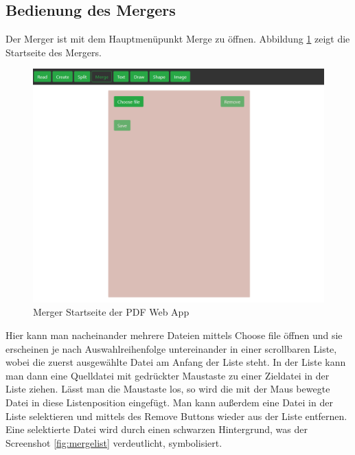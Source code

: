 \subsection{Bedienung des Mergers}
Der Merger ist mit dem Hauptmenüpunkt Merge zu öffnen. Abbildung \ref{fig:merger} zeigt die Startseite des Mergers. 

\begin{figure}[!htbp]
	\centering
	\includegraphics[width=1\textwidth]{"images/merger.png"}
	\caption{Merger Startseite der PDF Web App}
	\label{fig:merger}
\end{figure}

Hier kann man nacheinander mehrere Dateien mittels Choose file öffnen und sie erscheinen je nach Auswahlreihenfolge untereinander in einer scrollbaren Liste, wobei die zuerst ausgewählte Datei am Anfang der Liste steht. In der Liste kann man dann eine Quelldatei mit gedrückter Maustaste zu einer Zieldatei in der Liste ziehen. Lässt man die Maustaste los, so wird die mit der Maus bewegte Datei in diese Listenposition eingefügt. Man kann außerdem eine Datei in der Liste selektieren und mittels des Remove Buttons wieder aus der Liste entfernen. Eine selektierte Datei wird durch einen schwarzen Hintergrund, was der Screenshot \ref{fig:mergelist} verdeutlicht, symbolisiert.

